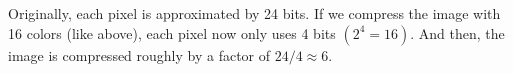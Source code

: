 \begin{answer}
Originally, each pixel is approximated by 24 bits. If we compress the image with 16 colors (like above), each pixel now only uses 4 bits $(2^4 = 16)$. And then, the image is compressed roughly by a factor of $24/4 \approx 6$. \\
\end{answer}
